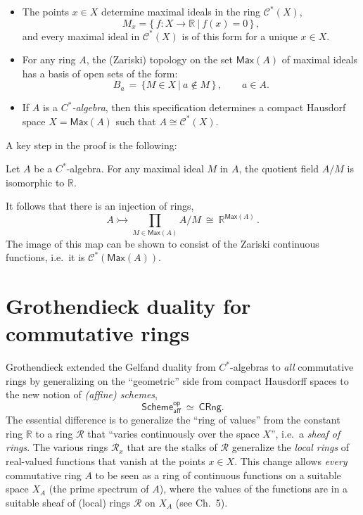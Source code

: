 \documentclass[graybox]{svmult}
\newcommand{\mono}{\ensuremath{\rightarrowtail}}
\begin{document}
\begin{itemize}
\item The points  $x\in X$ determine maximal ideals in the ring $\mathcal{C}^*(X)$,
\[
M_x = \{\, f : X\to \mathbb{R}\ |\ f(x) = 0\, \}\,,
\]
and every maximal ideal in $\mathcal{C}^*(X)$ is of this form for a unique $x\in X$.

\item For any ring $A$, the (Zariski) topology on the set $\mathsf{Max}(A)$ of maximal ideals has a basis of open sets of the form:
\[
B_a\, =\, \{M \in X\ |\ a\notin M\, \}\, ,\qquad a\in A.
\]

\item If $A$ is a \emph{$C^*$-algebra}, then this specification  determines a compact Hausdorf space $X = \mathsf{Max}(A)$ such that $A\cong \mathcal{C}^*(X)$.
\end{itemize}

A key step in the proof is the following:
%
 \begin{proposition}
 Let $A$ be a $C^*$-algebra.  For any maximal ideal $M$ in $A$, the quotient field 
 $A/M$ is isomorphic to  $\mathbb{R}$. 
    \end{proposition}
%   
It follows that there is an injection of rings,
$$A \mono \prod_{M\in \mathsf{Max}(A)}\!\!A/M\ \cong\ \mathbb{R}^{\mathsf{Max}(A)}\,.$$
The image of this map can be shown to consist of the Zariski continuous functions, i.e.\  it is $\mathcal{C}^*(\mathsf{Max}(A))$.



\section{Grothendieck duality for commutative rings}

Grothendieck extended the Gelfand duality from $C^*$-algebras to \emph{all} commutative rings by generalizing on the ``geometric'' side from compact Hausdorff spaces to the new notion of \emph{(affine) schemes},
 \[
\mathsf{Scheme}_\mathsf{aff}^\mathsf{op}\ \simeq\ \mathsf{CRng}.
 \]
The essential difference is to generalize the ``ring of values'' from the constant ring $\mathbb{R}$ to a ring $\mathcal{R}$ that ``varies continuously over the space $X$'', i.e.\ a \emph{sheaf of rings}.   
The various rings $\mathcal{R}_x$ that are the stalks of $\mathcal{R}$ generalize the \emph{local rings} of real-valued functions that vanish at the points $x\in X$.
This change allows \emph{every} commutative ring $A$ to be seen as a ring of continuous functions on a suitable space $X_A$ (the prime spectrum of $A$), where the values of the functions are in a suitable sheaf of (local) rings $\mathcal{R}$ on $X_A$ (see \cite{J} Ch.~5).
\end{document}
